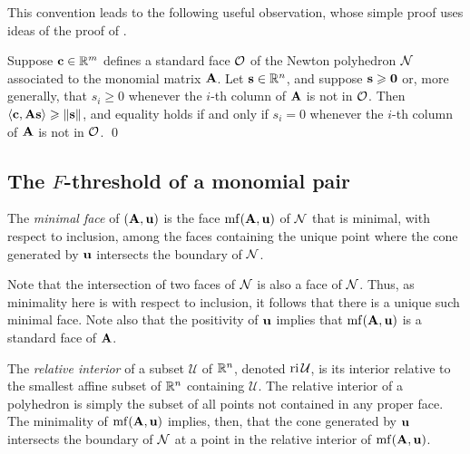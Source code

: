 \documentclass{amsart}
\begin{document}
This convention leads to the following useful observation, whose simple proof uses ideas of the proof of .

\begin{proposition}
   \label{prop: inner product with columns of A}
   Suppose $\mathbf{c} \in \mathbb{R}^m$ defines a standard face $\mathcal{O}$ of the Newton polyhedron $\mathcal{N}$ associated to the monomial matrix $\mathbf{A}$.
   Let $\mathbf{s} \in \mathbb{R}^n$, and suppose $\mathbf{s} \geqslant \mathbf{0}$ or, more generally, that $s_i \ge 0$ whenever the $i$-th column of $\mathbf{A}$ is not in $\mathcal{O}$.
   Then $\langle \mathbf{c}, \mathbf{A}\mathbf{s} \rangle \geqslant \| \mathbf{s} \|$, and equality holds if and only if $s_i = 0$ whenever the $i$-th column of $\mathbf{A}$ is not in $\mathcal{O}$.
   \qed
\end{proposition}

\subsection{The $F$-threshold of a monomial pair}

\begin{definition}
   The \emph{minimal face} of $(\mathbf{A}, \mathbf{u})$ is the face $\operatorname{mf}(\mathbf{A}, \mathbf{u})$ of $\mathcal{N}$ that is minimal, with respect to inclusion, among the faces containing the unique point where the cone generated by $\mathbf{u}$ intersects the boundary of $\mathcal{N}$.
\end{definition}

Note that the intersection of two faces of $\mathcal{N}$ is also a face of $\mathcal{N}$.
Thus, as minimality here is with respect to inclusion, it follows that there is a unique such minimal face.
Note also that the positivity of $\mathbf{u}$ implies that $\operatorname{mf}(\mathbf{A},\mathbf{u})$ is a standard face of $\mathbf{A}$.

The \emph{relative interior} of a subset $\mathcal{U}$ of $\mathbb{R}^n$, denoted $\operatorname{ri} \mathcal{U}$, is its interior relative to the smallest affine subset of $\mathbb{R}^n$ containing $\mathcal{U}$.
The relative interior of a polyhedron is simply the subset of all points not contained in any proper face.
The minimality of $\operatorname{mf}(\mathbf{A},\mathbf{u})$ implies, then, that the cone generated by $\mathbf{u}$ intersects the boundary of $\mathcal{N}$ at a point in the relative interior of $\operatorname{mf}(\mathbf{A},\mathbf{u})$.
\end{document}
